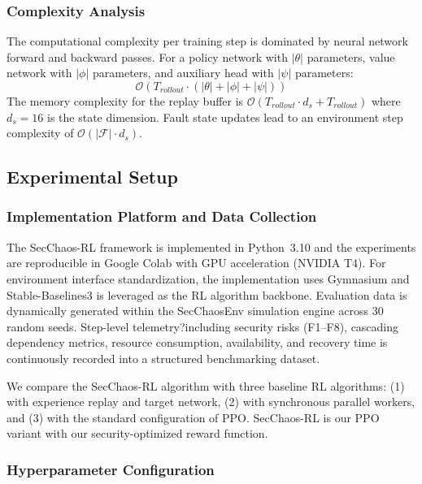 \documentclass[pdflatex,sn-mathphys-num]{sn-jnl}%
\theoremstyle{thmstyleone}%
\theoremstyle{thmstyletwo}%
\theoremstyle{thmstylethree}%
\begin{document}
	\subsubsection{Complexity Analysis}
	
	The computational complexity per training step is dominated by neural network forward and backward passes. For a policy network with $|\theta|$ parameters, value network with $|\phi|$ parameters, and auxiliary head with $|\psi|$ parameters:
	\begin{equation}
		\mathcal{O}(T_{rollout} \cdot (|\theta| + |\phi| + |\psi|))
	\end{equation}
	The memory complexity for the replay buffer is $\mathcal{O}(T_{rollout} \cdot d_s + T_{rollout})$ where $d_s = 16$ is the state dimension. Fault state updates lead to an environment step complexity of $\mathcal{O}(|\mathcal{F}| \cdot d_s)$.
	
	\subsection{Experimental Setup}
	
	\subsubsection{Implementation Platform and Data Collection}
	The SecChaos-RL framework is implemented in Python~3.10 and the experiments are reproducible in Google Colab with GPU acceleration (NVIDIA T4). For environment interface standardization, the implementation uses Gymnasium \cite{towers2026gymnasium} and Stable-Baselines3 \cite{raffin2021stable} is leveraged as the RL algorithm backbone.
	Evaluation data is dynamically generated within the SecChaosEnv simulation engine across 30 random seeds. Step-level telemetry?including security risks (F1--F8), cascading dependency metrics, resource consumption, availability, and recovery time is continuously recorded into a structured benchmarking dataset.
	
	We compare the SecChaos-RL algorithm with three baseline RL algorithms: (1)  \cite{mnih2015human} with experience replay and target network, (2)  \cite{mnih2016asynchronous} with synchronous parallel workers, and (3)  \cite{schulman2017ppo} with the standard configuration of PPO. SecChaos-RL is our PPO variant with our security-optimized reward function.
	
	\subsubsection{Hyperparameter Configuration}
	
\end{document}
